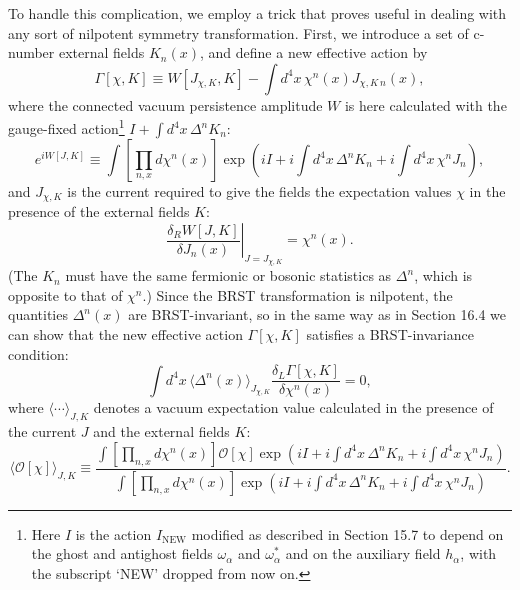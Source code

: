 To handle this complication, we employ a trick that proves useful in dealing with any sort of nilpotent symmetry transformation. First, we introduce a set of c-number external fields $K_n(x)$, and define a new effective action by
\begin{equation}
\Gamma[\chi,K]\equiv W[J_{\chi,K},K]
-\int d^4x\,\chi^n(x)J_{\chi,K\,n}(x),
\tag{17.1.3}\label{eq:17.1.3}
\end{equation}
where the connected vacuum persistence amplitude $W$ is here calculated with the gauge-fixed action\footnote{Here $I$ is the action $I_{\mathrm{NEW}}$ modified as described in Section 15.7 to depend on the ghost and antighost fields $\omega_\alpha$ and $\omega_\alpha^*$ and on the auxiliary field $h_\alpha$, with the subscript `NEW' dropped from now on.} $I+\int d^4x\,\Delta^nK_n$:
\begin{equation}
e^{iW[J,K]}\equiv
\int\left[\prod_{n,x}d\chi^n(x)\right]
\exp\left(iI+i\int d^4x\,\Delta^nK_n
+i\int d^4x\,\chi^nJ_n\right),
\tag{17.1.4}\label{eq:17.1.4}
\end{equation}
and $J_{\chi,K}$ is the current required to give the fields the expectation values $\chi$ in the presence of the external fields $K$:
\begin{equation}
\left.\frac{\delta_R W[J,K]}{\delta J_n(x)}\right|_{J=J_{\chi,K}}
=\chi^n(x).
\tag{17.1.5}\label{eq:17.1.5}
\end{equation}
(The $K_n$ must have the same fermionic or bosonic statistics as $\Delta^n$, which is opposite to that of $\chi^n$.) Since the BRST transformation is nilpotent, the quantities $\Delta^n(x)$ are BRST-invariant, so in the same way as in Section 16.4 we can show that the new effective action $\Gamma[\chi,K]$ satisfies a BRST-invariance condition:
\begin{equation}
\int d^4x\,\langle\Delta^n(x)\rangle_{J_{\chi,K}}
\frac{\delta_L\Gamma[\chi,K]}{\delta\chi^n(x)}=0,
\tag{17.1.6}\label{eq:17.1.6}
\end{equation}
where $\langle\cdots\rangle_{J,K}$ denotes a vacuum expectation value calculated in the presence of the current $J$ and the external fields $K$:
\begin{equation}
\langle\mathcal O[\chi]\rangle_{J,K}\equiv
\frac{
\int\left[\prod_{n,x}d\chi^n(x)\right]\mathcal O[\chi]
\exp\left(iI+i\int d^4x\,\Delta^nK_n+i\int d^4x\,\chi^nJ_n\right)
}{
\int\left[\prod_{n,x}d\chi^n(x)\right]
\exp\left(iI+i\int d^4x\,\Delta^nK_n+i\int d^4x\,\chi^nJ_n\right)
}.
\tag{17.1.7}\label{eq:17.1.7}
\end{equation}
